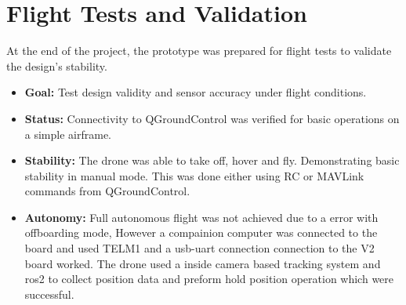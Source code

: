 \documentclass[12pt,a4paper]{article}
\begin{document}

\section{Flight Tests and Validation}
At the end of the project, the prototype was prepared for flight tests to validate the design's stability.
\begin{itemize}
    \item \textbf{Goal:} Test design validity and sensor accuracy under flight conditions.
    \item \textbf{Status:} Connectivity to QGroundControl was verified for basic operations on a simple airframe.
    \item \textbf{Stability:} The drone was able to take off, hover and fly. Demonstrating basic stability in manual mode. This was done either using RC or MAVLink commands from QGroundControl.
    \item \textbf{Autonomy:} Full autonomous flight was not achieved due to a error with offboarding mode, However a compainion computer was connected to the board and used TELM1 and a usb-uart connection connection to the V2 board worked. The drone used a inside camera based tracking system and ros2 to collect position data and preform hold position operation which were successful.
\end{itemize}

\end{document}
